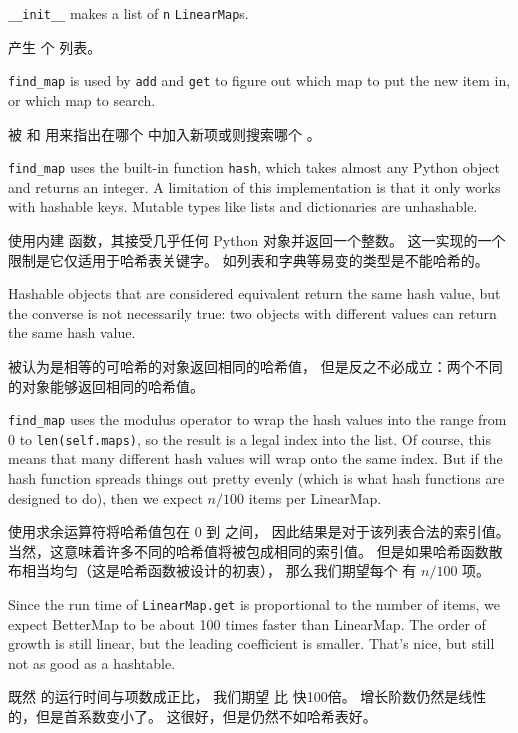 \verb"__init__" makes a list of {\tt n} {\tt LinearMap}s.

 产生  个  列表。

\verb"find_map" is used by
{\tt add} and {\tt get}
to figure out which map to put the
new item in, or which map to search.

 被  和  用来指出在哪个  中加入新项或则搜索哪个 。

\verb"find_map" uses the built-in function {\tt hash}, which takes
almost any Python object and returns an integer.  A limitation of this
implementation is that it only works with hashable keys.  Mutable
types like lists and dictionaries are unhashable.

 使用内建  函数，其接受几乎任何 Python 对象并返回一个整数。
这一实现的一个限制是它仅适用于哈希表关键字。 如列表和字典等易变的类型是不能哈希的。

Hashable objects that are considered equivalent return the same hash
value, but the converse is not necessarily true: two objects with
different values can return the same hash value.

被认为是相等的可哈希的对象返回相同的哈希值，
但是反之不必成立：两个不同的对象能够返回相同的哈希值。

\verb"find_map" uses the modulus operator to wrap the hash values
into the range from 0 to {\tt len(self.maps)}, so the result is a legal
index into the list.  Of course, this means that many different
hash values will wrap onto the same index.  But if the hash function
spreads things out pretty evenly (which is what hash functions
are designed to do), then we expect $n/100$ items per LinearMap.

 使用求余运算符将哈希值包在 0 到  之间，
因此结果是对于该列表合法的索引值。 当然，这意味着许多不同的哈希值将被包成相同的索引值。 但是如果哈希函数散布相当均匀（这是哈希函数被设计的初衷）， 那么我们期望每个  有 $n/100$ 项。

Since the run time of {\tt LinearMap.get} is proportional to the
number of items, we expect BetterMap to be about 100 times faster
than LinearMap.  The order of growth is still linear, but the
leading coefficient is smaller.  That's nice, but still not
as good as a hashtable.

既然  的运行时间与项数成正比，
我们期望  比  快100倍。
增长阶数仍然是线性的，但是首系数变小了。 这很好，但是仍然不如哈希表好。

